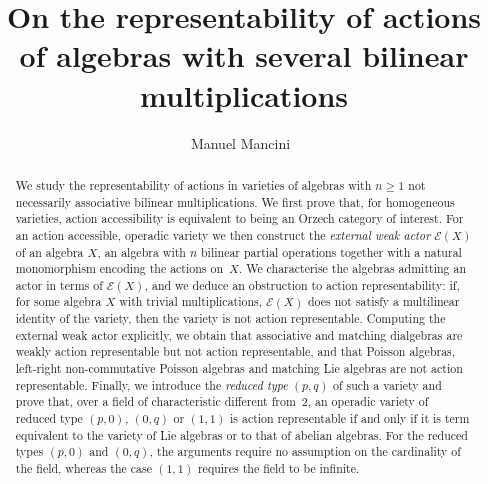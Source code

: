 \documentclass[reqno,a4paper]{amsart}
\date{}
\theoremstyle{plain}
\theoremstyle{definition}
\theoremstyle{remark}
\numberwithin{equation}{section}
\newcommand{\E}{\mathcal{E}}
\begin{document}
\title[Actions of algebras with several bilinear multiplications]{On the representability of actions of algebras with several bilinear multiplications}

\author[M.~Mancini]{Manuel Mancini~}


\address{Institut de Recherche en Mathématique et Physique, Université catholique de Louvain, chemin du cyclotron 2 bte L7.01.02, B--1348 Louvain-la-Neuve, Belgium.}
\address{Dipartimento di Matematica e Informatica, Università degli Studi di Palermo, Via Archirafi 34, 90123 Palermo, Italy.}

\begin{abstract}
We study the representability of actions in varieties of algebras with $n \geq 1$ not necessarily associative bilinear multiplications. We first prove that, for homogeneous varieties, action accessibility is equivalent to being an Orzech category of interest. For an action accessible, operadic variety we then construct the \emph{external weak actor} $\E(X)$ of an algebra $X$, an algebra with $n$ bilinear partial operations together with a natural monomorphism encoding the actions on~$X$. We characterise the algebras admitting an actor in terms of $\E(X)$, and we deduce an obstruction to action representability: if, for some algebra $X$ with trivial multiplications, $\E(X)$ does not satisfy a multilinear identity of the variety, then the variety is not action representable. Computing the external weak actor explicitly, we obtain that associative and matching dialgebras are weakly action representable but not action representable, and that Poisson algebras, left-right non-commutative Poisson algebras and matching Lie algebras are not action representable. Finally, we introduce the \emph{reduced type} $(p,q)$ of such a variety and prove that, over a field of characteristic different from~$2$, an operadic variety of reduced type $(p,0)$, $(0,q)$ or $(1,1)$ is action representable if and only if it is term equivalent to the variety of Lie algebras or to that of abelian algebras.
For the reduced types $(p,0)$ and $(0,q)$, the arguments require no assumption on the cardinality of the field, whereas the case $(1,1)$ requires the field to be infinite.
\end{abstract}

\end{document}
